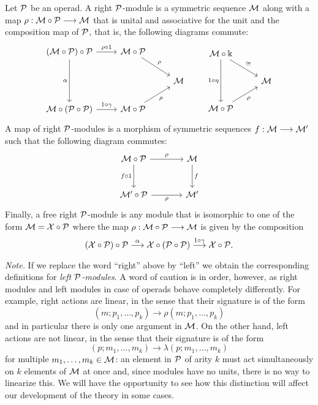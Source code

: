 \begin{definition}
Let ${\mathcal{P}}$ be an operad. A right ${\mathcal{P}}$-module is a symmetric
sequence $\mathcal M$ along with a map $\rho :\mathcal M\circ{\mathcal{P}}\longrightarrow \mathcal M$
that is unital and associative for the unit and the composition
map of ${\mathcal{P}}$, that is, the following diagrams commute:
\[
\begin{tikzcd}
(\MM\circ \PP)\circ \PP 
	\arrow[r,"\rho\circ 1"]
	\arrow[dd,"\alpha",swap] 				& \MM\circ \PP \arrow[dr,"\rho"] \\
	{} 						& {} 			& \MM\\
\MM\circ (\PP \circ \PP) \arrow[r,"1\circ\gamma"] & 
	\MM \circ \PP \arrow[ur,"\rho",swap]
\end{tikzcd}
\qquad
\begin{tikzcd}
\MM\circ \kk \arrow[dd,"1\circ\eta",swap] \arrow[dr,"\cong"] & {} \\
 {}                               &  \MM \\
\MM\circ \PP \arrow[ur,"\rho",swap]
\end{tikzcd}
\]
A map of right ${\mathcal{P}}$-modules is a morphism
of symmetric sequences $f:\mathcal M\longrightarrow \mathcal M'$ 
such that the following diagram commutes:
\[
\begin{tikzcd}[row sep = large, column sep = large]
\MM\circ \PP \arrow[r,"\rho"]
	\arrow[d,"f\circ 1",swap] & \MM \arrow[d,"f"]\\
\MM'\circ \PP \arrow[r,"\rho",swap] & \MM'
\end{tikzcd}
\]
Finally, a free right ${\mathcal{P}}$-module is any module that is isomorphic
to one of the form $\mathcal M = \mathcal{X}\circ{\mathcal{P}}$ where the map $\rho : \mathcal M\circ{\mathcal{P}}
\longrightarrow \mathcal M$ is given by the composition
\[
(\mathcal{X}\circ {\mathcal{P}})\circ{\mathcal{P}} 
\stackrel{\alpha}{\longrightarrow}
\mathcal{X} \circ ({\mathcal{P}} \circ {\mathcal{P}}) 
	\stackrel{1\circ\gamma}{\longrightarrow} 
		\mathcal{X}\circ {\mathcal{P}}.
\]
\end{definition}

\emph{Note.} If we replace the word ``right'' above by ``left'' we obtain
the corresponding definitions for \emph{left ${\mathcal{P}}$-modules}. A word of
caution is in order, however, as right modules and left modules in
case of operads behave completely differently. For example, right
actions are linear, in the sense that their signature is of the
form
\[
(m;p_1,\ldots,p_k) \longrightarrow \rho(m;p_1,\ldots,p_k)
\] 
and in particular there is only one argument in $\mathcal M$. On the
other hand, left actions are not linear, in the sense that their
signature is of the form
\[
(p;m_1,\ldots,m_k) \longrightarrow \lambda(p;m_1,\ldots,m_k)
\] 
for multiple $m_1,\ldots,m_k\in \mathcal M$: an element in ${\mathcal{P}}$
of arity $k$ must act simultaneously on $k$ elements of $\mathcal M$
at once and, since modules have no units, there is no way
to linearize this. We will have the opportunity to see
how this distinction will affect our development of the
theory in some cases.

